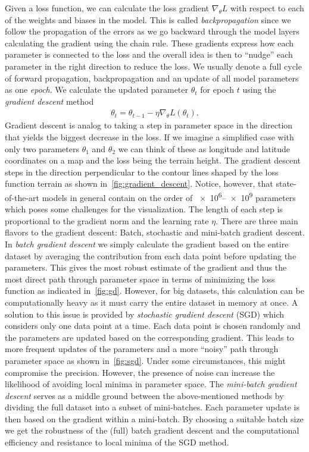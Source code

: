 Given a loss function, we can calculate the loss gradient $\nabla_\theta L$ with respect to each of the weights and biases in the model. This is called \textit{backpropagation} since we follow the propagation of the errors as we go backward through the model layers calculating the gradient using the chain rule. These gradients express how each parameter is connected to the loss and the overall idea is then to ``nudge'' each parameter in the right direction to reduce the loss. We usually denote a full cycle of forward propagation, backpropagation and an update of all model parameters as one \textit{epoch}. We calculate the updated parameter $\theta_t$ for epoch $t$ using the \textit{gradient descent} method
\begin{align}
  \theta_{t} = \theta_{t-1} - \eta \nabla_\theta L(\theta_t).
  \label{eq:grad_descent}
\end{align}
Gradient descent is analog to taking a step in parameter space in the direction
that yields the biggest decrease in the loss. If we imagine a simplified case
with only two parameters $\theta_1$ and $\theta_2$ we can think of these as longitude and latitude coordinates on a map and the loss being the terrain height. The gradient descent steps in the direction perpendicular to the contour lines shaped by the loss function terrain as shown in~\cref{fig:gradient_descent}. Notice, however, that state-of-the-art models in general contain on the order of \num{e6}--\num{e9} parameters \cite{thompson2022computational} which poses some challenges for the visualization.  The length of each step is proportional to the gradient norm and the learning rate $\eta$. There are three main flavors to the gradient descent: Batch,
stochastic and mini-batch gradient descent. In \textit{batch gradient descent} we simply
calculate the gradient based on the entire dataset by averaging the contribution
from each data point before updating the parameters. This gives the most robust estimate of the gradient and thus the most direct path through parameter space in terms of minimizing the loss function as
indicated in~\cref{fig:gd}. However, for big datasets, this calculation can be
computationally heavy as it must carry the entire dataset in memory at once. A
solution to this issue is provided by \textit{stochastic gradient descent}
(\acrshort{SGD}) which considers only one data point at a time. Each data point is chosen randomly and the parameters are updated based on the corresponding gradient. This leads to more frequent updates of the parameters and a more ``noisy'' path through parameter space as shown in~\cref{fig:sgd}. Under some circumstances, this might compromise the precision. However, the presence of noise can increase the likelihood of avoiding local minima in parameter space. The \textit{mini-batch gradient descent} serves as a middle ground between the above-mentioned methods by dividing the full dataset into a subset of mini-batches. Each parameter update is then based on the gradient within a mini-batch. By choosing a suitable batch size we get the robustness of the (full) batch gradient descent and the computational efficiency and resistance to local minima of the \acrshort{SGD} method. 


